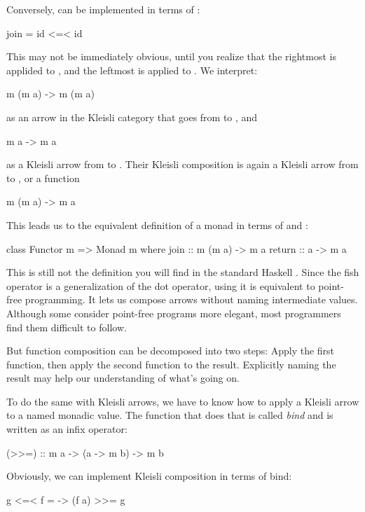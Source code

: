 \documentclass[DaoFP]{subfiles}
\begin{document}
Conversely,  can be implemented in terms of \hask{<=<}:
\begin{haskell}
join = id <=< id
\end{haskell}
This may not be immediately obvious, until you realize that the rightmost  is applided to , and the leftmost is applied to . We interpret:
\begin{haskell}
m (m a) -> m (m a)
\end{haskell}
as an arrow in the Kleisli category that goes from  to , and 
\begin{haskell}
m a -> m a
\end{haskell}
as a Kleisli arrow from  to . Their Kleisli composition is again a Kleisli arrow from  to , or a function 
\begin{haskell}
m (m a) -> m a
\end{haskell}

This leads us to the equivalent definition of a monad in terms of  and :
\begin{haskell}
class Functor m => Monad m where
  join :: m (m a) -> m a
  return :: a -> m a
\end{haskell}

This is still not the definition you will find in the standard Haskell . Since the fish operator is a generalization of the dot operator, using it is equivalent to point-free programming. It lets us compose arrows without naming intermediate values. Although some consider point-free programs more elegant, most programmers find them difficult to follow. 

But function composition can be decomposed into two steps: Apply the first function, then apply the second function to the result. Explicitly naming the result may help our understanding of what's going on.

To do the same with Kleisli arrows, we have to know how to apply a Kleisli arrow to a named monadic value. The function that does that is called \emph{bind} and is written as an infix operator:
\begin{haskell}
(>>=) :: m a -> (a -> m b) -> m b
\end{haskell}
Obviously, we can implement Kleisli composition in terms of bind:

\begin{haskell}
g <=< f = \a -> (f a) >>= g
\end{haskell}
\end{document}
